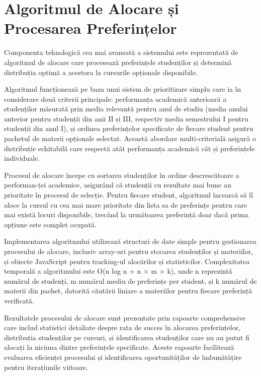 \documentclass[12pt,a4paper]{report}
\begin{document}
\section{Algoritmul de Alocare și Procesarea Preferințelor}

Componenta tehnologică cea mai avansată a sistemului este reprezentată de algoritmul de alocare \cite{algorithm-design} care procesează preferințele studenților și determină distribuția optimă a acestora la cursurile opționale disponibile.

Algoritmul funcționează pe baza unui sistem de prioritizare simplu care ia în considerare două criterii principale: performanța academică anterioară a studenților măsurată prin media relevantă pentru anul de studiu (media anului anterior pentru studenții din anii II și III, respectiv media semestrului I pentru studenții din anul I), și ordinea preferințelor specificate de fiecare student pentru pachetul de materii opționale selectat.
Această abordare multi-criterială asigură o distribuție echitabilă care respectă atât performanța academică cât și preferințele individuale.

Procesul de alocare începe cu sortarea studenților în ordine descrescătoare a performan-ței academice, asigurând că studenții cu rezultate mai bune au prioritate în procesul de selecție. Pentru fiecare student, algoritmul încearcă să îl aloce la cursul cu cea mai mare prioritate din lista sa de preferințe pentru care mai există locuri disponibile, trecând la următoarea preferință doar dacă prima opțiune este complet ocupată.

Implementarea algoritmului utilizează structuri de date simple \cite{data-structures} pentru gestionarea procesului de alocare, inclusiv array-uri pentru stocarea studenților și materiilor, și obiecte JavaScript pentru tracking-ul alocărilor și statisticilor. Complexitatea temporală a algoritmului este O(n log n + n × m × k), unde n reprezintă numărul de studenți, m numărul mediu de preferințe per student, și k numărul de materii din pachet, datorită căutării liniare a materiilor pentru fiecare preferință verificată.

Rezultatele procesului de alocare sunt prezentate prin rapoarte comprehensive care includ statistici detaliate despre rata de succes în alocarea preferințelor, distribuția studenților pe cursuri, și identificarea studenților care nu au putut fi alocați la niciuna dintre preferințele specificate. Aceste rapoarte facilitează evaluarea eficienței procesului și identificarea oportunităților de îmbunătățire pentru iterațiunile viitoare.
\end{document}
